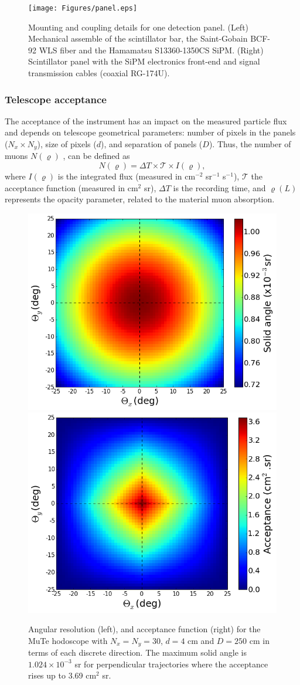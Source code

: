 \documentclass[letterpaper,11pt]{article}
\begin{document}
\begin{figure}[htb]
\centering
\texttt{[image: Figures/panel.eps]}
\caption{Mounting and coupling details for one detection panel. (Left) Mechanical assemble of the scintillator bar, the Saint-Gobain BCF-92 WLS fiber and the Hamamatsu S13360-1350CS SiPM. (Right) Scintillator panel with the SiPM electronics front-end and signal transmission cables (coaxial RG-174U).}
\label{fig:frame}
\end{figure}

\subsubsection{Telescope acceptance}

\label{acceptan}
The acceptance of the instrument has an impact on the measured particle flux and depends on telescope geometrical parameters: number of pixels in the panels ($N_x \times N_y$), size of pixels ($d$), and separation of panels ($D$). Thus, the number of muons $N(\varrho)$ \cite{LesparreEtal2010}, can be defined as
\begin{equation}
N(\varrho)=\Delta T \times \mathcal{T}\times I(\varrho), \label{Nmuons}
\end{equation}
where $I(\varrho)$ is the integrated flux (measured in cm$^{-2}$ sr$^{-1}$ s$^{-1}$), $\mathcal{T}$ the acceptance function (measured in cm$^{2}$ sr), $\Delta T$ is the recording time, and $\varrho(L)$ represents the opacity parameter, related to the material muon absorption.

\begin{figure}[htb]
\centering
\includegraphics[width=0.48\columnwidth]{Figures/Solid_angle.png}
\includegraphics[width=0.48\columnwidth]{Figures/Aceptancia.png}
\caption{Angular resolution (left), and acceptance function (right) for the MuTe hodoscope with $N_x=N_y=30$, $d=4$ cm and $D=250$ cm in terms of each discrete direction. The maximum solid angle is $1.024\times 10^{-3}$ sr for perpendicular trajectories where the acceptance rises up to 3.69 cm$^{2}$ sr.}
\label{fig:acceptance}
\end{figure}
\end{document}
